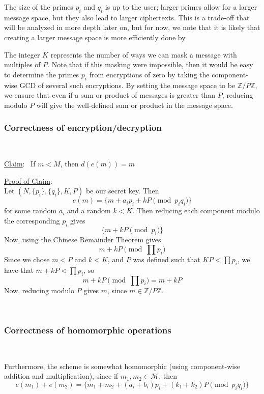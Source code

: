 \documentclass[11pt]{report}
\newcommand{\Z}{\mathbb{Z}}
\newcommand{\M}{\mathcal{M}}
\newcommand{\claim}{\underline{Claim}: \ }
\newcommand{\pf}{\underline{Proof of Claim}: \\ }
\begin{document}
The size of the primes $p_i$ and $q_i$ is up to the user; larger primes allow for a larger message space, but they also lead to larger ciphertexts. This is a trade-off that will be analyzed in more depth later on, but for now, we note that it is likely that creating a larger message space is more efficiently done by 

The integer $K$ represents the number of ways we can mask a message with multiples of $P$. Note that if this masking were impossible, then it would be easy to determine the primes $p_i$ from encryptions of zero by taking the component-wise GCD of several such encryptions. By setting the message space to be $\Z/P\Z$, we ensure that even if a sum or product of messages is greater than $P$, reducing modulo $P$ will give the well-defined sum or product in the message space.

\subsubsection{Correctness of encryption/decryption}

\

\claim If $m<M$, then $d(e(m)) = m$

\pf Let $(N,\{p_i\},\{q_i\},K,P)$ be our secret key. Then \begin{equation} e(m) = \{m+a_ip_i+kP \pmod{p_iq_i}\}\end{equation} for some random $a_i$ and a random $k<K$. Then reducing each component modulo the corresponding $p_i$ gives \begin{equation} \{m+kP \pmod{p_i}\} \end{equation} Now, using the Chinese Remainder Theorem gives \begin{equation} m+kP \pmod{\prod p_i} \end{equation} Since we chose $m<P$ and $k<K$, and $P$ was defined such that $KP<\prod p_i$, we have that $m+kP <\prod p_i$, so \begin{equation} m+kP \pmod{\prod p_i} = m+kP\end{equation} Now, reducing modulo $P$ gives $m$, since $m\in \Z/P\Z$.

\

\subsubsection{Correctness of homomorphic operations}

\

Furthermore, the scheme is somewhat homomorphic (using component-wise addition and multiplication), since if $m_1, m_2 \in \M$, then \begin{equation} e(m_1) + e(m_2) = \{m_1+m_2 + (a_i+b_i)p_i + (k_1+k_2)P \pmod{p_iq_i}\} \end{equation}
\end{document}
